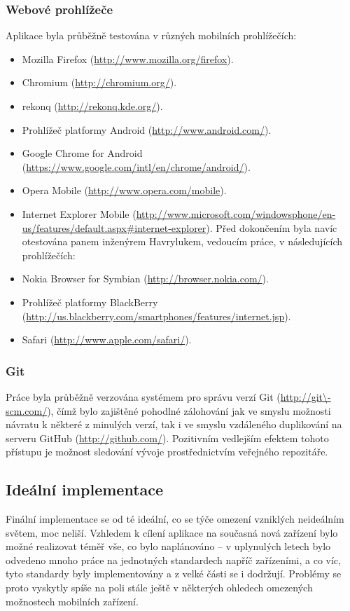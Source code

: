 \subsubsection{Webové prohlížeče}
Aplikace byla průběžně testována v různých mobilních prohlížečích:
\begin{itemize}
 \item Mozilla Firefox (\url{http://www.mozilla.org/firefox}).
 \item Chromium (\url{http://chromium.org/}).
 \item rekonq (\url{http://rekonq.kde.org/}).
 \item Prohlížeč platformy Android (\url{http://www.android.com/}).
 \item Google Chrome for Android (\url{https://www.google.com/intl/en/chrome/android/}).
 \item Opera Mobile (\url{http://www.opera.com/mobile}).
 \item Internet Explorer Mobile (\url{http://www.microsoft.com/windowsphone/en-us/features/default.aspx#internet-explorer}).
Před dokončením byla navíc otestována panem inženýrem Havrylukem, vedoucím práce, v následujících prohlížečích:
 \item Nokia Browser for Symbian  (\url{http://browser.nokia.com/}).
 \item Prohlížeč platformy BlackBerry (\url{http://us.blackberry.com/smartphones/features/internet.jsp}).
 \item Safari (\url{http://www.apple.com/safari/}).
\end{itemize}

\subsubsection{Git}
Práce byla průběžně verzována systémem pro správu verzí Git (\url{http://git\-scm.com/}), čímž bylo zajištěné pohodlné zálohování jak ve smyslu možnosti návratu k některé z minulých verzí, tak i ve smyslu vzdáleného duplikování na serveru GitHub (\url{http://github.com/}). Pozitivním vedlejším efektem tohoto přístupu je možnost sledování vývoje prostřednictvím veřejného repozitáře.


\subsection{Ideální implementace}
Finální implementace se od té ideální, co se týče omezení vzniklých neideálním světem, moc neliší. Vzhledem k cílení aplikace na současná nová zařízení bylo možné realizovat téměř vše, co bylo naplánováno -- v uplynulých letech bylo odvedeno mnoho práce na jednotných standardech napříč zařízeními, a co víc, tyto standardy byly implementovány a z velké části se i dodržují. Problémy se proto vyskytly spíše na poli stále ještě v některých ohledech omezených možnostech mobilních zařízení.

